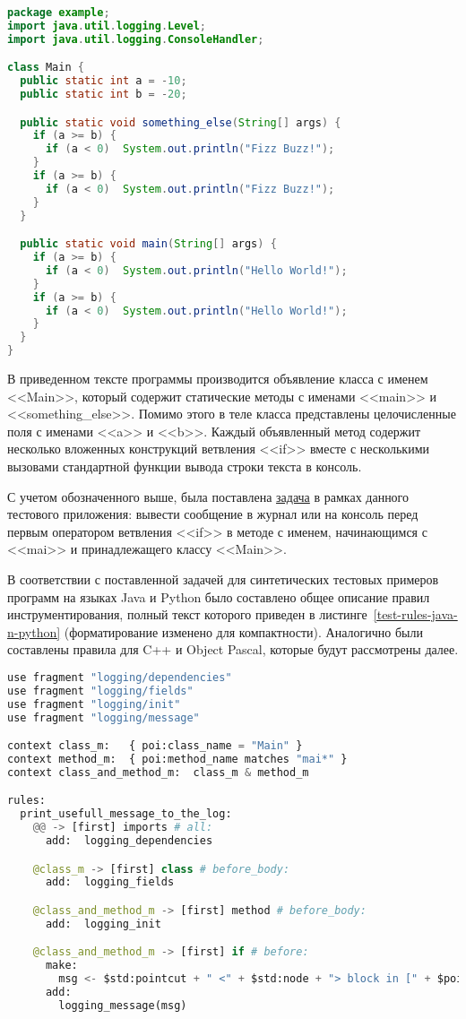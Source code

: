 \begin{lstlisting}[frame=single, language=Java, label={test-java}, caption={Исходный текст тестового приложения.}]
package example;
import java.util.logging.Level;
import java.util.logging.ConsoleHandler;

class Main {
  public static int a = -10;
  public static int b = -20;

  public static void something_else(String[] args) {
    if (a >= b) {
      if (a < 0)  System.out.println("Fizz Buzz!");
    }
    if (a >= b) {
      if (a < 0)  System.out.println("Fizz Buzz!");
    }
  }

  public static void main(String[] args) {
    if (a >= b) {
      if (a < 0)  System.out.println("Hello World!");
    }
    if (a >= b) {
      if (a < 0)  System.out.println("Hello World!");
    }
  }
}
\end{lstlisting}

В приведенном тексте программы производится объявление класса с именем <<Main>>, который содержит статические методы с именами <<main>> и <<something\_else>>.
Помимо этого в теле класса представлены целочисленные поля с именами <<a>> и <<b>>.
Каждый объявленный метод содержит несколько вложенных конструкций ветвления <<if>> вместе с несколькими вызовами стандартной функции вывода строки текста в консоль.

С учетом обозначенного выше, была поставлена \underline{задача} в рамках данного тестового приложения: вывести сообщение в журнал или на консоль перед первым оператором ветвления <<if>> в методе с именем, начинающимся с <<mai>> и принадлежащего классу <<Main>>.

В соответствии с поставленной задачей для синтетических тестовых примеров программ на языках Java и Python было составлено общее описание правил инструментирования, полный текст которого приведен в листинге~\ref{test-rules-java-n-python} (форматирование изменено для компактности).
Аналогично были составлены правила для C++ и Object Pascal, которые будут рассмотрены далее.

\begin{lstlisting}[frame=single, language=Python, label={test-rules-java-n-python}, caption={Описание правил инструментирования.}]
use fragment "logging/dependencies"
use fragment "logging/fields"
use fragment "logging/init"
use fragment "logging/message"

context class_m:   { poi:class_name = "Main" }
context method_m:  { poi:method_name matches "mai*" }
context class_and_method_m:  class_m & method_m

rules:
  print_usefull_message_to_the_log:
    @@ -> [first] imports # all:
      add:  logging_dependencies

    @class_m -> [first] class # before_body:
      add:  logging_fields

    @class_and_method_m -> [first] method # before_body:
      add:  logging_init

    @class_and_method_m -> [first] if # before:
      make:
        msg <- $std:pointcut + " <" + $std:node + "> block in [" + $poi:class_name + "] class, in {" + $poi:method_name + "} method";
      add:
        logging_message(msg)
\end{lstlisting}


